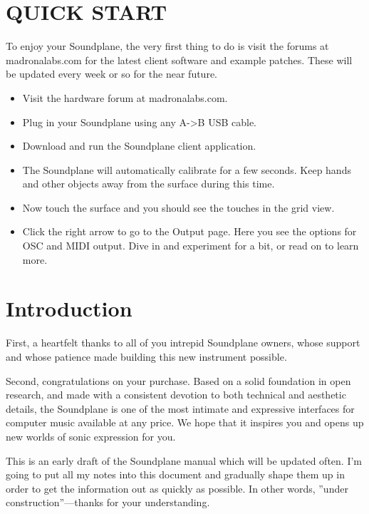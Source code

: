 


%
\chapter{QUICK START}

To enjoy your Soundplane, the very first thing to do is visit the forums at madronalabs.com for the latest client software and example patches.  These will be updated every week or so for the near future.  

\begin{itemize}
\item Visit the hardware forum at madronalabs.com.
\item Plug in your Soundplane using any A->B USB cable.
\item Download and run the Soundplane client application. 
\item The Soundplane will automatically calibrate for a few seconds.  Keep hands and other objects away from the surface during this time.
\item Now touch the surface and you should see the touches in the grid view.
\item Click the right arrow to go to the Output page. Here you see the options for OSC and MIDI output.  Dive in and experiment for a bit, or read on to learn more. 

\end{itemize}


\chapter{Introduction}

First, a heartfelt thanks to all of you intrepid Soundplane owners, whose support and whose patience made building this new instrument possible. 

Second, congratulations on your purchase.  Based on a solid foundation in open research, and made with a consistent devotion to both technical and aesthetic details, the Soundplane is one of the most intimate and expressive interfaces for computer music available at any price.  We hope that it inspires you and opens up new worlds of sonic expression for you. 

This is an early draft of the Soundplane manual which will be updated often.  I'm going to put all my notes into this document and gradually shape them up in order to get the information out as quickly as possible.  In other words, ”under construction”—thanks for your understanding. 


